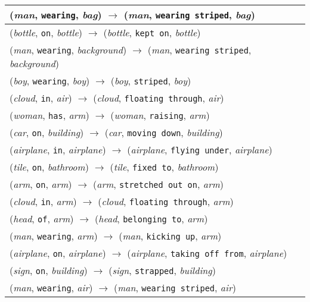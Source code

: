 \documentclass[runningheads]{llncs}
\begin{document}
{\begin{longtable}{ l }
(\textit{man}, \texttt{wearing}, \textit{bag}) $\rightarrow$ (\textit{man}, \texttt{wearing striped}, \textit{bag}) \\ \hline
(\textit{bottle}, \texttt{on}, \textit{bottle}) $\rightarrow$ (\textit{bottle}, \texttt{kept on}, \textit{bottle}) \\ \hline
(\textit{man}, \texttt{wearing}, \textit{background}) $\rightarrow$ (\textit{man}, \texttt{wearing striped}, \textit{background}) \\ \hline
(\textit{boy}, \texttt{wearing}, \textit{boy}) $\rightarrow$ (\textit{boy}, \texttt{striped}, \textit{boy}) \\ \hline
(\textit{cloud}, \texttt{in}, \textit{air}) $\rightarrow$ (\textit{cloud}, \texttt{floating through}, \textit{air}) \\ \hline
(\textit{woman}, \texttt{has}, \textit{arm}) $\rightarrow$ (\textit{woman}, \texttt{raising}, \textit{arm}) \\ \hline
(\textit{car}, \texttt{on}, \textit{building}) $\rightarrow$ (\textit{car}, \texttt{moving down}, \textit{building}) \\ \hline
(\textit{airplane}, \texttt{in}, \textit{airplane}) $\rightarrow$ (\textit{airplane}, \texttt{flying under}, \textit{airplane}) \\ \hline
(\textit{tile}, \texttt{on}, \textit{bathroom}) $\rightarrow$ (\textit{tile}, \texttt{fixed to}, \textit{bathroom}) \\ \hline
(\textit{arm}, \texttt{on}, \textit{arm}) $\rightarrow$ (\textit{arm}, \texttt{stretched out on}, \textit{arm}) \\ \hline
(\textit{cloud}, \texttt{in}, \textit{arm}) $\rightarrow$ (\textit{cloud}, \texttt{floating through}, \textit{arm}) \\ \hline
(\textit{head}, \texttt{of}, \textit{arm}) $\rightarrow$ (\textit{head}, \texttt{belonging to}, \textit{arm}) \\ \hline
(\textit{man}, \texttt{wearing}, \textit{arm}) $\rightarrow$ (\textit{man}, \texttt{kicking up}, \textit{arm}) \\ \hline
(\textit{airplane}, \texttt{on}, \textit{airplane}) $\rightarrow$ (\textit{airplane}, \texttt{taking off from}, \textit{airplane}) \\ \hline
(\textit{sign}, \texttt{on}, \textit{building}) $\rightarrow$ (\textit{sign}, \texttt{strapped}, \textit{building}) \\ \hline
(\textit{man}, \texttt{wearing}, \textit{air}) $\rightarrow$ (\textit{man}, \texttt{wearing striped}, \textit{air}) \\ \hline

\end{longtable}}
\end{document}
